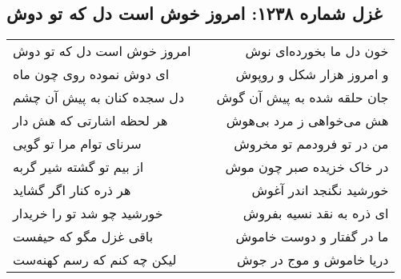 \begin{center}
\section*{غزل شماره ۱۲۳۸: امروز خوش است دل که تو دوش}
\label{sec:1238}
\begin{longtable}{l p{0.5cm} r}
امروز خوش است دل که تو دوش
&&
خون دل ما بخورده‌ای نوش
\\
ای دوش نموده روی چون ماه
&&
و امروز هزار شکل و روپوش
\\
دل سجده کنان به پیش آن چشم
&&
جان حلقه شده به پیش آن گوش
\\
هر لحظه اشارتی که هش دار
&&
هش می‌خواهی ز مرد بی‌هوش
\\
سرنای توام مرا تو گویی
&&
من در تو فرودمم تو مخروش
\\
از بیم تو گشته شیر گربه
&&
در خاک خزیده صبر چون موش
\\
هر ذره کنار اگر گشاید
&&
خورشید نگنجد اندر آغوش
\\
خورشید چو شد تو را خریدار
&&
ای ذره به نقد نسیه بفروش
\\
باقی غزل مگو که حیفست
&&
ما در گفتار و دوست خاموش
\\
لیکن چه کنم که رسم کهنه‌ست
&&
دریا خاموش و موج در جوش
\\
\end{longtable}
\end{center}
